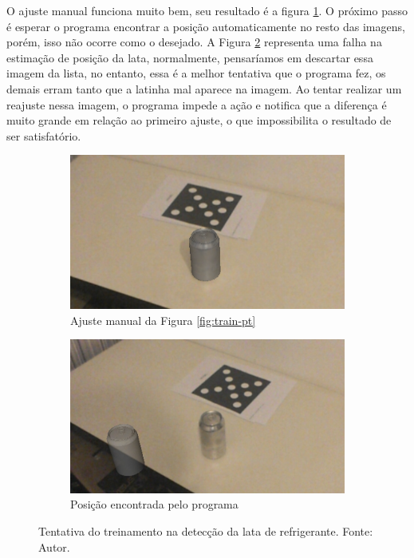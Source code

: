 O ajuste manual funciona muito bem, seu resultado é a figura \ref{fig:ajuste-manual}. O próximo passo é esperar o programa encontrar a posição automaticamente no resto das imagens, porém, isso não ocorre como o desejado. A Figura \ref{fig:estimation} representa uma falha na estimação de posição da lata, normalmente, pensaríamos em descartar essa imagem da lista, no entanto, essa é a melhor tentativa que o programa fez, os demais erram tanto que a latinha mal aparece na imagem. Ao tentar realizar um reajuste nessa imagem, o programa impede a ação e notifica que a diferença é muito grande em relação ao primeiro ajuste, o que impossibilita o resultado de ser satisfatório.

\begin{figure}[ht]
\centering
    \begin{subfigure}{0.45\textwidth}
        \centering
        \includegraphics[width=.95\textwidth]{figuras/Latinha-ideal.png}
        \caption{Ajuste manual da Figura \ref{fig:train-pt}}
        \label{fig:ajuste-manual}
    \end{subfigure}
    \begin{subfigure}{0.45\textwidth}
        \includegraphics[width=.95\linewidth]{figuras/Latinha-errada.png}
        \caption{Posição encontrada pelo programa }
        \label{fig:estimation}
    \end{subfigure}
    \caption{Tentativa do treinamento na detecção da lata de refrigerante. Fonte: Autor.}
    \label{fig:pose-estimation}
\end{figure}

